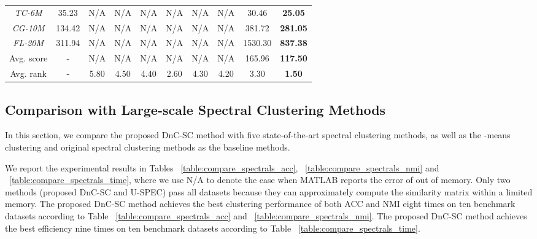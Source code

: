 \documentclass[a4paper,fleqn]{cas-dc}
\begin{document}
\begin{table*}[]
{\begin{tabular}{@{}c||c||ccccccc|c@{}}
      \emph{TC-6M    } & 35.23    & N/A                & N/A                    & N/A                     & N/A                        & N/A                 & N/A                 & 30.46  & \textbf{25.05}  \\
      \emph{CG-10M    } & 134.42    & N/A                & N/A                    & N/A                     & N/A                        & N/A                 & N/A                 & 381.72  & \textbf{281.05}  \\
      \emph{FL-20M}     & 311.94    & N/A                & N/A                 & N/A                         & N/A                 & N/A                 & N/A                 & 1530.30   & \textbf{837.38} \\
      \midrule
      \midrule
      Avg. score       & \multicolumn{1}{c}{-} & N/A                & N/A                    & N/A                     & N/A                        & N/A                 & N/A                 & 165.96               & \textbf{117.50}                             \\
      \midrule
      \midrule
      Avg. rank        & \multicolumn{1}{c}{-} & 5.80               & 4.50                   & 4.40                    & 2.60                       & 4.30                & 4.20                & 3.30                & \textbf{1.50 }                            \\
      \bottomrule
    \end{tabular}}
\end{table*}

\subsection{Comparison with Large-scale Spectral Clustering Methods}
\label{sec:cmp_spectral}


In this section, we compare the proposed DnC-SC method with five state-of-the-art spectral clustering methods, as well as the -means clustering and original spectral clustering methods as the baseline methods. 

We report the experimental results in Tables ~\ref{table:compare_spectrals_acc}, ~\ref{table:compare_spectrals_nmi} and ~\ref{table:compare_spectrals_time}, where we use N/A to denote the case when MATLAB reports the error of out of memory.
Only two methods (proposed DnC-SC and U-SPEC) pass all datasets because they can approximately compute the similarity matrix within a limited memory.
The proposed DnC-SC method achieves the best clustering performance of both ACC and NMI eight times on ten benchmark datasets according to Table ~\ref{table:compare_spectrals_acc} and ~\ref{table:compare_spectrals_nmi}.
The proposed DnC-SC method achieves the best efficiency nine times on ten benchmark datasets according to Table ~\ref{table:compare_spectrals_time}.
\end{document}
